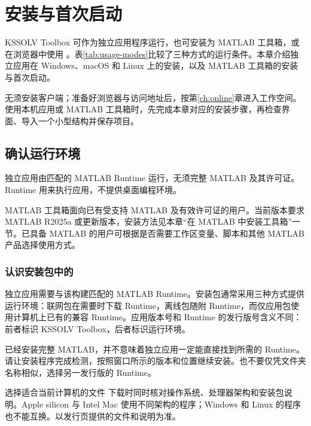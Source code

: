 \chapter{安装与首次启动}\label{ch:install}

KSSOLV Toolbox 可作为独立应用程序运行，也可安装为 MATLAB\regmark{} 工具箱，或在浏览器中使用 \ksonline{}。表\ref{tab:usage-modes}比较了三种方式的运行条件。本章介绍独立应用在 Windows、macOS 和 Linux 上的安装，以及 MATLAB\regmark{} 工具箱的安装与首次启动。

\ksonline{} 无须安装客户端；准备好浏览器与访问地址后，按第\ref{ch:online}章进入工作空间。使用本机应用或 MATLAB\regmark{} 工具箱时，先完成本章对应的安装步骤，再检查界面、导入一个小型结构并保存项目。

\section{确认运行环境}

独立应用由匹配的 MATLAB\regmark{} Runtime 运行，无须完整 MATLAB\regmark{} 及其许可证。Runtime 用来执行应用，不提供桌面编程环境。

MATLAB\regmark{} 工具箱面向已有受支持 MATLAB\regmark{} 及有效许可证的用户。当前版本要求 MATLAB\regmark{} R2025a 或更新版本，安装方法见本章“在 MATLAB\regmark{} 中安装工具箱”一节。已具备 MATLAB\regmark{} 的用户可根据是否需要工作区变量、脚本和其他 MATLAB\regmark{} 产品选择使用方式。

\subsection{认识安装包中的 }

独立应用需要与该构建匹配的 MATLAB\regmark{} Runtime。安装包通常采用三种方式提供运行环境：联网包在需要时下载 Runtime，离线包随附 Runtime，而仅应用包使用计算机上已有的兼容 Runtime。应用版本号和 Runtime 的发行版号含义不同：前者标识 KSSOLV Toolbox，后者标识运行环境。

已经安装完整 MATLAB\regmark{}，并不意味着独立应用一定能直接找到所需的 Runtime。请让安装程序完成检测，按照窗口所示的版本和位置继续安装。也不要仅凭文件夹名称相似，选择另一发行版的 Runtime。

\begin{notebox}{选择适合当前计算机的文件}
下载时同时核对操作系统、处理器架构和安装包说明。Apple silicon 与 Intel Mac 使用不同架构的程序；Windows 和 Linux 的程序也不能互换。以发行页提供的文件和说明为准。
\end{notebox}

